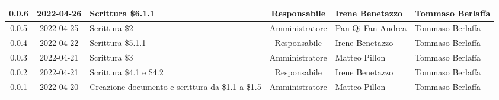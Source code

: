 \begin{center}
\begin{longtable}{ |c|c|p{8em}|c|m{5em}|m{5em}| }
	\hline
	0.0.6 & 2022-04-26 & Scrittura \$6.1.1 & Responsabile & Irene \newline Benetazzo & Tommaso \newline Berlaffa\\
	\hline 
	0.0.5& 2022-04-25 & Scrittura \$2 & Amministratore & Pan Qi Fan \newline Andrea & Tommaso \newline Berlaffa\\
	\hline
	0.0.4 & 2022-04-22 & Scrittura \$5.1.1 & Responsabile & Irene \newline Benetazzo & Tommaso \newline Berlaffa\\
	\hline 
	0.0.3 & 2022-04-21 & Scrittura \$3 & Amministratore & Matteo \newline Pillon & Tommaso \newline Berlaffa\\
	\hline
	0.0.2 & 2022-04-21 & Scrittura \newline \$4.1 e \$4.2 & Responsabile & Irene \newline Benetazzo & Tommaso \newline Berlaffa\\
	\hline
    0.0.1 & 2022-04-20 & Creazione documento e scrittura \newline da \$1.1 a \$1.5 & Amministratore & Matteo \newline Pillon & Tommaso \newline Berlaffa \\ 
	\hline
	\end{longtable}
	\end{center}
	\newpage